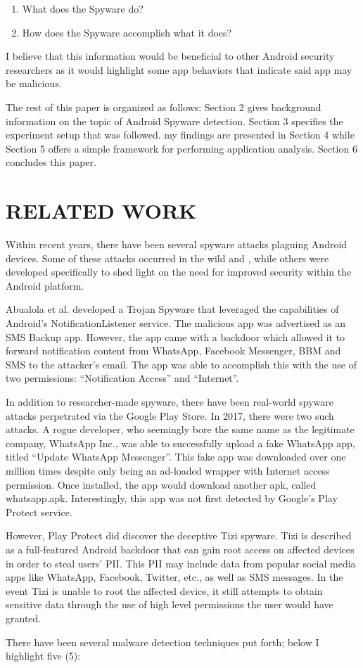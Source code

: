 \documentclass[conference]{IEEEtran}
\begin{document}
\begin{enumerate}
    \item What does the Spyware do?
    \item How does the Spyware accomplish what it does?
\end{enumerate}

I believe that this information would be beneficial to other Android security researchers as it would highlight some app behaviors that indicate said app may be malicious. 
\par The rest of this paper is organized as follows: Section 2 gives background information on the topic of Android Spyware detection. Section 3 specifies the experiment setup that was followed. my findings are presented in Section 4 while Section 5 offers a simple framework for performing application analysis. Section 6 concludes this paper.


\section{RELATED WORK}
Within recent years, there have been several spyware attacks plaguing Android devices. Some of these attacks occurred in the wild  and , while others were developed specifically to shed light on the need for improved security within the Android platform. 
\par Abualola et al.  developed a Trojan Spyware that leveraged the capabilities of Android’s NotificationListener service. The malicious app was advertised as an SMS Backup app. However, the app came with a backdoor which allowed it to forward notification content from WhatsApp, Facebook Messenger, BBM and SMS to the attacker’s email. The app was able to accomplish this with the use of two permissions: “Notification Access” and “Internet”.
\par In addition to researcher-made spyware, there have been real-world spyware attacks perpetrated via the Google Play Store. In 2017, there were two such attacks. A rogue developer, who seemingly bore the same name as the legitimate company, WhatsApp Inc., was able to successfully upload a fake WhatsApp app, titled “Update WhatsApp Messenger”. This fake app was downloaded over one million times despite only being an ad-loaded wrapper with Internet access permission. Once installed, the app would download another apk, called whatsapp.apk. Interestingly, this app was not first detected by Google’s Play Protect service.
\par However, Play Protect did discover the deceptive Tizi spyware. Tizi is described as a full-featured Android backdoor that can gain root access on affected devices in order to steal users’ PII. This PII may include data from popular social media apps like WhatsApp, Facebook, Twitter, etc., as well as SMS messages. In the event Tizi is unable to root the affected device, it still attempts to obtain sensitive data through the use of high level permissions the user would have granted.
\par There have been several malware detection techniques put forth; below I highlight
five (5):
\end{document}
